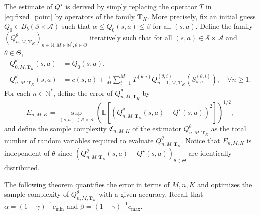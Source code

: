 \documentclass[11pt]{article}
\numberwithin{equation}{section}
\theoremstyle{definition}
\theoremstyle{remark}
\def\cA{\mathcal{A}}
\def\cS{\mathcal{S}}
\def\N{{\mathbb{N}}}
\begin{document}
The estimate of $Q^\star$
is derived by simply 
replacing the operator $T$ in \eqref{eq:fixed_point} by operators of the family
$\mathbf T_K$. 
More precisely, fix  
an initial guess  $Q_0 \in B_b(\cS \times \cA)$ 
such that $\alpha \leq Q_0(s,a) \leq \beta$ for all $(s,a)$.
Define 
the family $({Q}_{n,M,\mathbf T_K}^\theta)_{n\in \N, M\in \N^*,\theta\in \Theta}$ iteratively 
such that for all $(s,a)\in \cS\times \cA$ and $\theta\in \Theta$, 
\begin{equation}
    \label{eq:def-iterative-mc}
    \begin{aligned}
    {Q}_{0,M,\mathbf T_K}^\theta (s,a) &= Q_0(s,a),  
    \\
    {Q}_{n,M,\mathbf T_K}^\theta(s,a) &= c(s,a) + \frac{\gamma}{M} \sum_{i = 1}^M T^{(\theta, i)} {Q}_{n-1,M,\mathbf T_K}^{(\theta, i)} \left(S_{s,a}^{(\theta, i)}\right), \quad   \forall n \geq 1.
    \end{aligned}
\end{equation}
For each $n\in \N^*$,
define the error of 
${Q}_{n,M,\mathbf T_K}^\theta$
by 
$$
E_{n,M,K } = \sup_{(s,a)\in \cS\times \cA} \left( \mathbb E \left[ \left({Q}_{n,M,\mathbf T_K}^\theta(s,a) - Q^\star(s,a) \right)^2 \right]\right)^{1/2},
$$
and define the sample complexity
$\mathfrak C_{n,M, K}$ of the estimator $ {Q}_{n,M,\mathbf T_K}^\theta$
  as the total number of random variables required to evaluate
$ {Q}_{n,M,\mathbf T_K}^\theta$. Notice that $E_{n,M,K}$ is independent of $\theta$ since $(Q^\theta_{n,M,\mathbf T_K}(s,a) - Q^\star(s,a))_{\theta \in \Theta}$ are identically distributed.

The following theorem quantifies the error in terms of $M, n , K$ 
and optimizes the sample complexity
of ${Q}_{n,M,\mathbf T_K}^\theta$ with a given accuracy.
Recall 
  that $\alpha =  (1 - \gamma)^{-1}c_{\min}$ and $ \beta =   (1 - \gamma)^{-1}c_{\max}$.
\end{document}
